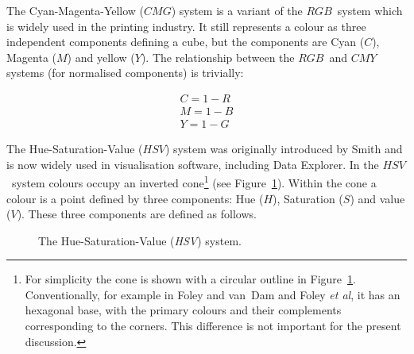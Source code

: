 \documentclass[twoside,11pt]{article}
\begin{document}
The Cyan-Magenta-Yellow ($CMG$) system is a variant of the $RGB$\,
system which is widely used in the printing industry. It still
represents a colour as three independent components defining a cube,
but the components are Cyan ($C$), Magenta ($M$) and yellow ($Y$). The
relationship between the $RGB$\, and $CMY$\, systems (for normalised
components) is trivially:

\begin{eqnarray}
C = 1 - R  \nonumber \\
M = 1 - B  \\
Y = 1 - G  \nonumber
\end{eqnarray}

The Hue-Saturation-Value ($HSV$) system was originally introduced by
Smith\cite{SMITH78} and is now widely used in visualisation software,
including Data Explorer. In the $HSV$\, system colours occupy an
inverted cone\footnote{For simplicity the cone is shown with a circular
outline in Figure~\ref{HSV}. Conventionally, for example in Foley and
van~Dam\cite{FOLEY1} and Foley {\it et al}\cite{FOLEY2}, it has an
hexagonal base, with the primary colours and their complements
corresponding to the corners. This difference is not important for the
present discussion.} (see Figure~\ref{HSV}). Within the cone a colour is
a point defined by three components: Hue ($H$), Saturation ($S$) and value
($V$). These three components are defined as follows.

\begin{figure}[htbp]

\begin{center}
\leavevmode
\epsfxsize=434pt
\end{center}

\caption[The Hue-Saturation-Value ({\it HSV}) system.]{The
Hue-Saturation-Value ({\it HSV}) system. \label{HSV} }

\end{figure}
\end{document}
